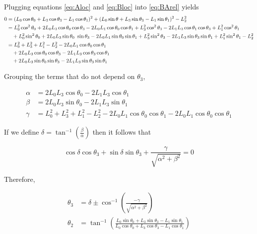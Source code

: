 \documentclass[letterpaper]{article}
\begin{document}
\noindent Plugging equations \ref{eq:Aloc} and \ref{eq:Bloc} into \ref{eq:BArel} yields
\begin{align}
	0 &= (L_0 \cos \theta_0 + L_3 \cos \theta_3 - L_1 \cos \theta_1)^2 + (L_0 \sin \theta + L_3 \sin \theta_3 - L_1 \sin \theta_1)^2 - L_2^2 \notag \\
	  &= L_0^2 \cos^2 \theta_0 + 2 L_0 L_3 \cos \theta_0 \cos \theta_3 - 2 L_0 L_1 \cos \theta_0 \cos \theta_1 + L_3^2 \cos^2 \theta_3 - 2 L_1 L_3 \cos \theta_1 \cos \theta_3 + L_1^2 \cos^2 \theta_1 \notag \\
	  & \quad  + L_0^2 \sin^2 \theta_0 + 2 L_0 L_3 \sin \theta_0\ \sin \theta_3 -2 L_0 L_1 \sin \theta_0 \sin \theta_1 + L_3^2 \sin^2 \theta_3 - 2 L_1 L_3 \sin \theta_3 \sin \theta_1 + L_1^2 \sin^2 \theta_1 - L_2^2 \notag \\
	  &= L_0^2 + L_3^2 + L_1^2 - L_2^2 - 2 L_0 L_1 \cos \theta_0 \cos \theta_1 \notag \\
	  &  \quad + 2 L_0 L_3 \cos \theta_0 \cos \theta_3 - 2 L_1 L_3 \cos \theta_3 \cos \theta_1 \notag \\
	  &  \quad + 2 L_0 L_3 \sin \theta_0 \sin \theta_3 - 2 L_1 L_3 \sin \theta_3 \sin \theta_1
\end{align}

\noindent Grouping the terms that do not depend on $\theta_3$,

\begin{align}
	\alpha &= 2 L_0 L_3 \cos \theta_0 - 2 L_1 L_3 \cos \theta_1 \\
	\beta &=  2 L_0 L_3 \sin \theta_0 - 2 L_1 L_3 \sin \theta_1 \\
	\gamma &= L_0^2 + L_3^2 + L_1^2 - L_2^2 - 2 L_0 L_1 \cos \theta_0 \cos \theta_1 - 2 L_0 L_1 \cos \theta_0 \cos \theta_1
\end{align}

\noindent If we define $\delta = \tan^{-1} \left( \frac{\beta}{\alpha} \right)$ then it follows that

\begin{equation}
	\cos \delta \cos \theta_3 + \sin \delta \sin \theta_3 + \frac{\gamma}{\sqrt{\alpha^2 + \beta^2}} = 0
\end{equation}

\noindent Therefore, 

\begin{align}
	\theta_3 &= \delta \pm \cos^{-1} \left( \frac{- \gamma}{\sqrt{\alpha^2 + \beta^2}} \right) \\
	\theta_2 &= \tan^{-1} \left( \frac{ L_0 \sin \theta_0 + L_3 \sin \theta_3 - L_1 \sin \theta_1}{L_0 \cos \theta_0 + L_3 \cos \theta_3 - L_1 \cos \theta_1} \right)
\end{align}
\end{document}
